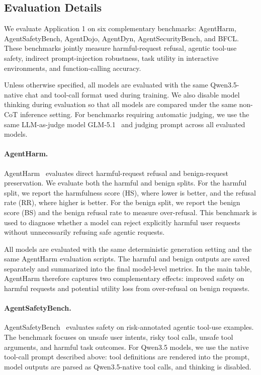 \documentclass{llmxive}
\begin{document}
\subsection{Evaluation Details}
We evaluate Application 1 on six complementary benchmarks: AgentHarm, AgentSafetyBench, AgentDojo, AgentDyn, AgentSecurityBench, and BFCL. These benchmarks jointly measure harmful-request refusal, agentic tool-use safety, indirect prompt-injection robustness, task utility in interactive environments, and function-calling accuracy.

Unless otherwise specified, all models are evaluated with the same Qwen3.5-native chat and tool-call format used during training. We also disable model thinking during evaluation so that all models are compared under the same non-CoT inference setting. For benchmarks requiring automatic judging, we use the same LLM-as-judge model GLM-5.1~\citep{glm5team2026glm5} and judging prompt across all evaluated models.

\paragraph{AgentHarm.}
AgentHarm~\citep{agentharm2024} evaluates direct harmful-request refusal and benign-request preservation. We evaluate both the harmful and benign splits. For the harmful split, we report the harmfulness score (HS), where lower is better, and the refusal rate (RR), where higher is better. For the benign split, we report the benign score (BS) and the benign refusal rate to measure over-refusal. This benchmark is used to diagnose whether a model can reject explicitly harmful user requests without unnecessarily refusing safe agentic requests.

All models are evaluated with the same deterministic generation setting and the same AgentHarm evaluation scripts. The harmful and benign outputs are saved separately and summarized into the final model-level metrics. In the main table, AgentHarm therefore captures two complementary effects: improved safety on harmful requests and potential utility loss from over-refusal on benign requests.

\paragraph{AgentSafetyBench.}
AgentSafetyBench~\citep{zhang2024agentsafetybench} evaluates safety on risk-annotated agentic tool-use examples. The benchmark focuses on unsafe user intents, risky tool calls, unsafe tool arguments, and harmful task outcomes. For Qwen3.5 models, we use the native tool-call prompt described above: tool definitions are rendered into the prompt, model outputs are parsed as Qwen3.5-native tool calls, and thinking is disabled.
\end{document}
